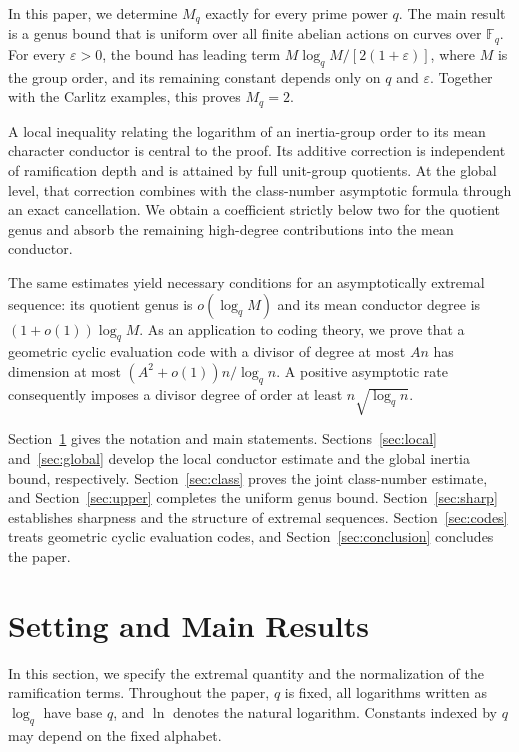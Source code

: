 \documentclass[12pt,onecolumn,draftclsnofoot,letterpaper]{IEEEtran}
\theoremstyle{remark}
\newcommand{\F}{\mathbb F}
\begin{document}
In this paper, we determine $M_q$ exactly for every prime power $q$. The main result is a genus bound that is uniform over all finite abelian actions on curves over $\F_q$. For every $\varepsilon>0$, the bound has leading term $M\log_qM/[2(1+\varepsilon)]$, where $M$ is the group order, and its remaining constant depends only on $q$ and $\varepsilon$. Together with the Carlitz examples, this proves $M_q=2$.

A local inequality relating the logarithm of an inertia-group order to its mean character conductor is central to the proof. Its additive correction is independent of ramification depth and is attained by full unit-group quotients. At the global level, that correction combines with the class-number asymptotic formula through an exact cancellation. We obtain a coefficient strictly below two for the quotient genus and absorb the remaining high-degree contributions into the mean conductor.

The same estimates yield necessary conditions for an asymptotically extremal sequence: its quotient genus is $o(\log_q M)$ and its mean conductor degree is $(1+o(1))\log_q M$. As an application to coding theory, we prove that a geometric cyclic evaluation code with a divisor of degree at most $An$ has dimension at most $(A^2+o(1))n/\log_qn$. A positive asymptotic rate consequently imposes a divisor degree of order at least $n\sqrt{\log_qn}$.

Section~\ref{sec:setting} gives the notation and main statements. Sections~\ref{sec:local} and~\ref{sec:global} develop the local conductor estimate and the global inertia bound, respectively. Section~\ref{sec:class} proves the joint class-number estimate, and Section~\ref{sec:upper} completes the uniform genus bound. Section~\ref{sec:sharp} establishes sharpness and the structure of extremal sequences. Section~\ref{sec:codes} treats geometric cyclic evaluation codes, and Section~\ref{sec:conclusion} concludes the paper.

\section{Setting and Main Results}\label{sec:setting}
In this section, we specify the extremal quantity and the normalization of the ramification terms. Throughout the paper, $q$ is fixed, all logarithms written as $\log_q$ have base $q$, and $\ln$ denotes the natural logarithm. Constants indexed by $q$ may depend on the fixed alphabet.
\end{document}
